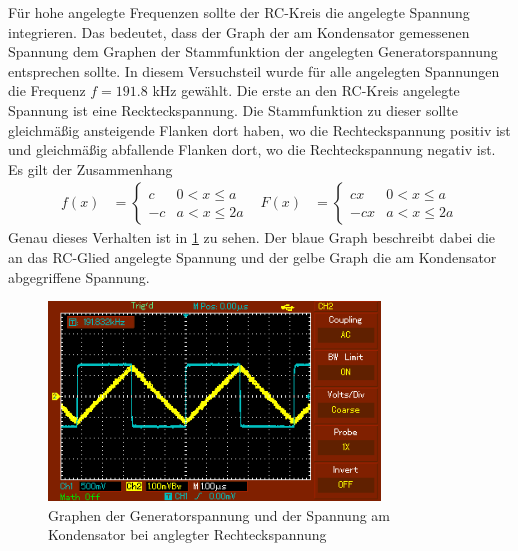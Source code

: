 Für hohe angelegte Frequenzen sollte der RC-Kreis die angelegte Spannung integrieren.
Das bedeutet, dass der Graph der am Kondensator gemessenen Spannung dem Graphen der
Stammfunktion der angelegten Generatorspannung entsprechen sollte. In diesem Versuchsteil
wurde für alle angelegten Spannungen die Frequenz $f=191.8$ kHz gewählt.
Die erste an den RC-Kreis angelegte Spannung ist eine Reckteckspannung. Die Stammfunktion
zu dieser sollte gleichmäßig ansteigende Flanken dort haben, wo die Rechteckspannung
positiv ist und gleichmäßig abfallende Flanken dort, wo die Rechteckspannung
negativ ist. Es gilt der Zusammenhang
\begin{align}
  f(x)&=
  \begin{cases}
    c & 0<x\leq a\\
    -c & a<x\leq 2a
  \end{cases}
  & F(x)&=
  \begin{cases}
    c x & 0<x\leq a\\
    -c x & a<x\leq 2a
  \end{cases}
\end{align}
Genau dieses Verhalten ist in \ref{fig:rechteck} zu sehen. Der blaue Graph beschreibt
dabei die an das RC-Glied angelegte Spannung und der gelbe Graph die am Kondensator
abgegriffene Spannung.
\begin{figure}
  \centering
  \includegraphics[width=250pt]{data/integration_rechteck.PNG}
  \caption{Graphen der Generatorspannung und der Spannung am Kondensator bei anglegter
  Rechteckspannung}
  \label{fig:rechteck}
\end{figure}


